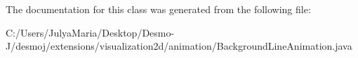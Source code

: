 The documentation for this class was generated from the following file\-:\begin{DoxyCompactItemize}
\item 
C\-:/\-Users/\-Julya\-Maria/\-Desktop/\-Desmo-\/\-J/desmoj/extensions/visualization2d/animation/Background\-Line\-Animation.\-java\end{DoxyCompactItemize}
